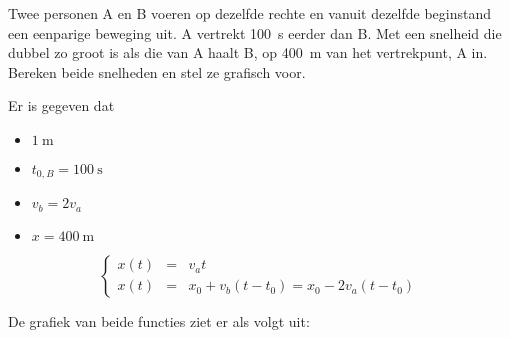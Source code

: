 \documentclass{ximera}
\begin{document}
\begin{exercise}
    Twee personen A en B voeren op dezelfde rechte en vanuit dezelfde beginstand een eenparige beweging uit. 
    A vertrekt \SI{100}{s} eerder dan B. Met een snelheid die dubbel zo groot is als die van A haalt B, op \SI{400}{m} van het vertrekpunt, A in. 
    Bereken beide snelheden en stel ze grafisch voor.

    \begin{oplossing}
    Er is gegeven dat 
    \begin{itemize}
        \item \(\SI{1}{\meter}\)
        \item \(t_{0,B} = \SI{100}{\second}\)
        \item \(v_b = 2v_a\)
        \item \(x = \SI{400}{\meter}\)
    \end{itemize}


    \[
    \left\{
        \begin{array}{rcl}
            x(t) &=&v_at\\
            x(t) &=&x_0+v_b(t-t_0) = x_0-2v_a(t-t_0)
        \end{array}
    \right.
    \]

    De grafiek van beide functies ziet er als volgt uit:
    
    \begin{image}[0.5\textwidth]
\end{image}
\end{oplossing}
\end{exercise}
\end{document}

